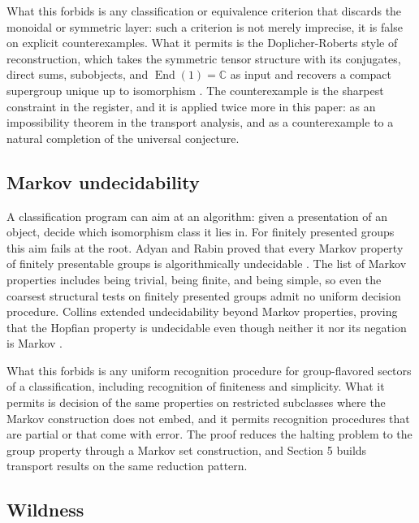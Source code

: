 \documentclass[11pt,letterpaper]{article}
\theoremstyle{definition}
\theoremstyle{remark}
\begin{document}
What this forbids is any classification or equivalence criterion that discards the monoidal or symmetric layer: such a criterion is not merely imprecise, it is false on explicit counterexamples. What it permits is the Doplicher-Roberts style of reconstruction, which takes the symmetric tensor structure with its conjugates, direct sums, subobjects, and $\operatorname{End}(1) = \mathbb{C}$ as input and recovers a compact supergroup unique up to isomorphism \cite{eg2000}. The counterexample is the sharpest constraint in the register, and it is applied twice more in this paper: as an impossibility theorem in the transport analysis, and as a counterexample to a natural completion of the universal conjecture.

\subsection{Markov undecidability}

A classification program can aim at an algorithm: given a presentation of an object, decide which isomorphism class it lies in. For finitely presented groups this aim fails at the root. Adyan and Rabin proved that every Markov property of finitely presentable groups is algorithmically undecidable \cite{adyan1955,rabin1958}. The list of Markov properties includes being trivial, being finite, and being simple, so even the coarsest structural tests on finitely presented groups admit no uniform decision procedure. Collins extended undecidability beyond Markov properties, proving that the Hopfian property is undecidable even though neither it nor its negation is Markov \cite{collins1969}.

What this forbids is any uniform recognition procedure for group-flavored sectors of a classification, including recognition of finiteness and simplicity. What it permits is decision of the same properties on restricted subclasses where the Markov construction does not embed, and it permits recognition procedures that are partial or that come with error. The proof reduces the halting problem to the group property through a Markov set construction, and Section 5 builds transport results on the same reduction pattern.

\subsection{Wildness}
\end{document}
